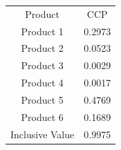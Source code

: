 \begin{tabular}{cc}
Product & CCP \\
Product 1 & 0.2973 \\
Product 2 & 0.0523 \\
Product 3 & 0.0029 \\
Product 4 & 0.0017 \\
Product 5 & 0.4769 \\
Product 6 & 0.1689 \\
Inclusive Value & 0.9975 \\
\end{tabular}